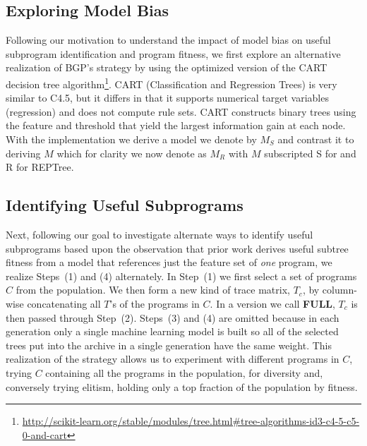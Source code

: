 \subsection{Exploring Model Bias}
Following our motivation to understand the impact of model bias on useful subprogram identification and program fitness, we first explore an alternative realization of BGP's strategy by using the \SCIKIT optimized version of the CART decision tree algorithm\footnote{\url{http://scikit-learn.org/stable/modules/tree.html\#tree-algorithms-id3-c4-5-c5-0-and-cart}}.  CART (Classification and Regression Trees) is very similar to C4.5, but it differs in that it supports numerical target variables (regression) and does not compute rule sets. CART constructs binary trees using the feature and threshold that yield the largest information gain at each node.  With the \SCIKIT implementation we derive a model we denote by $M_S$ and contrast it to deriving $M$ which for clarity we now denote as $M_R$ with $M$ subscripted S for \SCIKIT and R for REPTree. 

\subsection{Identifying Useful Subprograms}
\newcommand{\FULL}{\textbf{FULL}\xspace}
\newcommand{\DRAW}{\textbf{DRAW}\xspace}
Next, following our goal to investigate alternate ways to identify useful subprograms based upon the observation that prior work derives useful subtree fitness from a model that references just the feature set of \textit{one} program, we realize Steps~(1) and (4) alternately.  In Step~(1) we first select a set of programs  $C$ from the population. We then form a new kind of trace matrix, $T_c$, by column-wise concatenating all $T${'s} of the programs in $C$. In a version we call \FULL,  $T_c$ is then passed through Step~(2). Steps~(3) and (4) are omitted because in each generation only a single machine learning model is built so all of the selected trees put into the archive in a single generation have the same weight.  This realization of the strategy allows us to experiment with different programs in $C$, trying $C$ containing all the programs in the population, for diversity and, conversely trying elitism, holding only a top fraction of the  population by fitness. 


